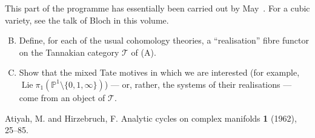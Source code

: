 \documentclass{article}
\theoremstyle{plain}
\theoremstyle{definition}
\newcommand{\sh}{\mathscr}
\newcommand{\PP}{\mathbb{P}}
\DeclareMathOperator{\Lie}{Lie}
\begin{document}
This part of the programme has essentially been carried out by May~\cite{26}.
For a cubic variety, see the talk of Bloch in this volume.

\begin{enumerate}[(A)]
\setcounter{enumi}{1}
  \item Define, for each of the usual cohomology theories, a ``realisation'' fibre functor on the Tannakian category $\sh{T}$ of (A).
  \item Show that the mixed Tate motives in which we are interested (for example, $\Lie\pi_1(\PP^1\setminus\{0,1,\infty\})$) --- or, rather, the systems of their realisations --- come from an object of $\sh{T}$.
\end{enumerate}



\nocite{*}

\begin{thebibliography}{10}

  {\sc Atiyah, M. and Hirzebruch, F.}
  \newblock Analytic cycles on complex manifolds
   \textbf{1} (1962), 25--85.

\end{thebibliography}
\end{document}
